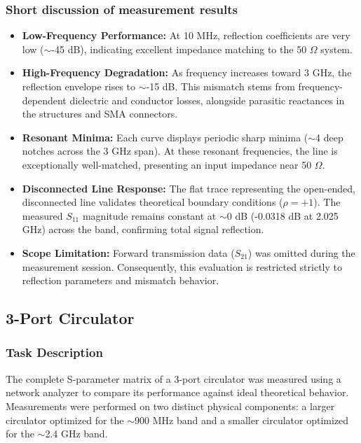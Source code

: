 \subsubsection{Short discussion of measurement results}

\begin{itemize}
    \item \textbf{Low-Frequency Performance:} At 10 MHz, reflection coefficients are very low ($\sim$-45 dB), indicating excellent impedance matching to the 50 $\Omega$ system.
    
    \item \textbf{High-Frequency Degradation:} As frequency increases toward 3 GHz, the reflection envelope rises to $\sim$-15 dB. This mismatch stems from frequency-dependent dielectric and conductor losses, alongside parasitic reactances in the structures and SMA connectors.
    
    \item \textbf{Resonant Minima:} Each curve displays periodic sharp minima ($\sim$4 deep notches across the 3 GHz span). At these resonant frequencies, the line is exceptionally well-matched, presenting an input impedance near 50 $\Omega$.
    
    \item \textbf{Disconnected Line Response:} The flat trace representing the open-ended, disconnected line validates theoretical boundary conditions ($\rho = +1$). The measured $S_{11}$ magnitude remains constant at $\sim$0 dB (-0.0318 dB at 2.025 GHz) across the band, confirming total signal reflection.
    
    \item \textbf{Scope Limitation:} Forward transmission data ($S_{21}$) was omitted during the measurement session. Consequently, this evaluation is restricted strictly to reflection parameters and mismatch behavior.
\end{itemize}

\subsection{3-Port Circulator}

\subsubsection{Task Description}
The complete S-parameter matrix of a 3-port circulator was measured using a network analyzer to compare its performance against ideal theoretical behavior. Measurements were performed on two distinct physical components: a larger circulator optimized for the $\sim$900 MHz band and a smaller circulator optimized for the $\sim$2.4 GHz band.

